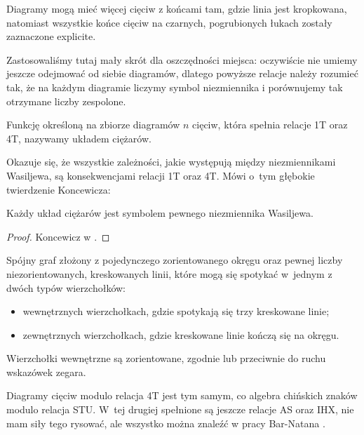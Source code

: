 Diagramy mogą mieć więcej cięciw z końcami tam, gdzie linia jest kropkowana, natomiast wszystkie końce cięciw na czarnych, pogrubionych łukach zostały zaznaczone explicite.

Zastosowaliśmy tutaj mały skrót dla oszczędności miejsca: oczywiście nie umiemy jeszcze odejmować od siebie diagramów, dlatego powyższe relacje należy rozumieć tak, że na każdym diagramie liczymy symbol niezmiennika i porównujemy tak otrzymane liczby zespolone.

\begin{definition}
    Funkcję określoną na zbiorze diagramów $n$ cięciw, która spełnia relacje 1T oraz 4T, nazywamy układem ciężarów.
\end{definition}

Okazuje się, że wszystkie zależności, jakie występują między niezmiennikami Wasiljewa, są konsekwencjami relacji 1T oraz 4T.
Mówi o~tym głębokie twierdzenie Koncewicza:

\begin{proposition}
    Każdy układ ciężarów jest symbolem pewnego niezmiennika Wasiljewa. %
\end{proposition}

\begin{proof}
    Koncewicz w \cite{kontsevich93}. %
\end{proof}

\begin{definition}
    Spójny graf złożony z pojedynczego zorientowanego okręgu oraz pewnej liczby niezorientowanych, kreskowanych linii, które mogą się spotykać w~jednym z dwóch typów wierzchołków:
    \begin{itemize}
        \item wewnętrznych wierzchołkach, gdzie spotykają się trzy kreskowane linie;
        \item zewnętrznych wierzchołkach, gdzie kreskowane linie kończą się na okręgu.
    \end{itemize}
    Wierzchołki wewnętrzne są zorientowane, zgodnie lub przeciwnie do ruchu wskazówek zegara.
\end{definition}

Diagramy cięciw modulo relacja 4T jest tym samym, co algebra chińskich znaków modulo relacja STU.
%
W~tej drugiej spełnione są jeszcze relacje AS oraz IHX, nie mam siły tego rysować, ale wszystko można znaleźć w pracy Bar-Natana \cite{barnatan_95}.


